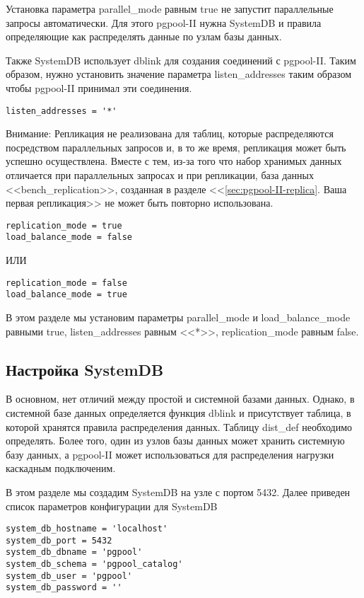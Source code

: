 Установка параметра parallel\_mode равным true не запустит параллельные запросы автоматически. 
Для этого pgpool-II нужна SystemDB и правила определяющие как распределять данные по узлам базы данных.

Также SystemDB использует dblink для создания соединений с pgpool-II. Таким образом, нужно установить значение 
параметра listen\_addresses таким образом чтобы pgpool-II принимал эти соединения.
\begin{lstlisting}[label=lst:pgpool23,caption=Настройка параллельного запроса]
listen_addresses = '*'
\end{lstlisting}

Внимание: Репликация не реализована для таблиц, которые распределяются посредством параллельных запросов и, 
в то же время, репликация может быть успешно осуществлена. Вместе с тем, из-за того что набор хранимых данных 
отличается при параллельных запросах и при репликации, база данных <<bench\_replication>>, созданная в разделе
<<\ref{sec:pgpool-II-replica}. Ваша первая репликация>> не может быть повторно использована.
\begin{lstlisting}[label=lst:pgpool24,caption=Настройка параллельного запроса]
replication_mode = true
load_balance_mode = false
\end{lstlisting}
ИЛИ
\begin{lstlisting}[label=lst:pgpool25,caption=Настройка параллельного запроса]
replication_mode = false
load_balance_mode = true
\end{lstlisting}

В этом разделе мы установим параметры parallel\_mode и load\_balance\_mode равными true, 
listen\_addresses равным <<*>>, replication\_mode равным false.


\subsection{Настройка SystemDB}
В основном, нет отличий между простой и системной базами данных. Однако, в системной базе данных определяется функция 
dblink и присутствует таблица, в которой хранятся правила распределения данных. Таблицу dist\_def необходимо определять. 
Более того, один из узлов базы данных может хранить системную базу данных, а pgpool-II может использоваться для 
распределения нагрузки каскадным подключеним.

В этом разделе мы создадим SystemDB на узле с портом 5432. Далее приведен список параметров конфигурации для SystemDB
\begin{lstlisting}[label=lst:pgpool26,caption=Настройка SystemDB]
system_db_hostname = 'localhost'
system_db_port = 5432
system_db_dbname = 'pgpool'
system_db_schema = 'pgpool_catalog'
system_db_user = 'pgpool'
system_db_password = ''
\end{lstlisting}

